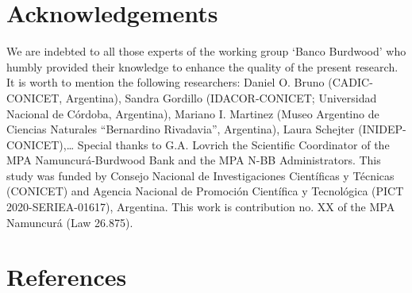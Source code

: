 \documentclass[preprint, 3p,
authoryear]{elsarticle} %
\begin{document}
\hypertarget{acknowledgements}{%
\section{Acknowledgements}\label{acknowledgements}}

We are indebted to all those experts of the working group `Banco
Burdwood' who humbly provided their knowledge to enhance the quality of
the present research. It is worth to mention the following researchers:
Daniel O. Bruno (CADIC-CONICET, Argentina), Sandra Gordillo
(IDACOR-CONICET; Universidad Nacional de Córdoba, Argentina), Mariano I.
Martinez (Museo Argentino de Ciencias Naturales ``Bernardino
Rivadavia'', Argentina), Laura Schejter (INIDEP-CONICET),\ldots{}
Special thanks to G.A. Lovrich the Scientific Coordinator of the MPA
Namuncurá-Burdwood Bank and the MPA N-BB Administrators. This study was
funded by Consejo Nacional de Investigaciones Científicas y Técnicas
(CONICET) and Agencia Nacional de Promoción Científica y Tecnológica
(PICT 2020-SERIEA-01617), Argentina. This work is contribution no. XX of
the MPA Namuncurá (Law 26.875).

\hypertarget{references}{%
\section*{References}\label{references}}
\end{document}

